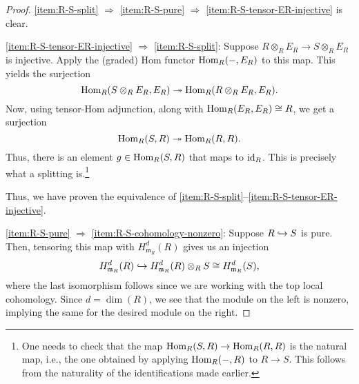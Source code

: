 \documentclass[12pt]{article}
\begin{document}
\begin{proof} 
	\ref{item:R-S-split} $\Rightarrow$ \ref{item:R-S-pure} $\Rightarrow$ \ref{item:R-S-tensor-ER-injective} is clear.

	\ref{item:R-S-tensor-ER-injective} $\Rightarrow$ \ref{item:R-S-split}: Suppose $R \otimes_{R} E_{R} \to S \otimes_{R} E_{R}$ is injective. \newline
	Apply the (graded) Hom functor $\operatorname{Hom}_{R}(-, E_{R})$ to this map. This yields the surjection
	\begin{equation*} 
		\operatorname{Hom}_{R}(S \otimes_{R} E_{R}, E_{R}) \twoheadrightarrow \operatorname{Hom}_{R}(R \otimes_{R} E_{R}, E_{R}).
	\end{equation*}
	Now, using tensor-Hom adjunction, along with $\operatorname{Hom}_{R}(E_{R}, E_{R}) \cong R$, we get a surjection
	\begin{equation*} 
		\operatorname{Hom}_{R}(S, R) \twoheadrightarrow \operatorname{Hom}_{R}(R, R).
	\end{equation*}
	Thus, there is an element $g \in \operatorname{Hom}_{R}(S, R)$ that maps to $\operatorname{id}_{R}$. This is precisely what a splitting is.\footnote{One needs to check that the map $\operatorname{Hom}_{R}(S, R) \to \operatorname{Hom}_{R}(R, R)$ is the natural map, i.e., the one obtained by applying $\operatorname{Hom}_{R}(-, R)$ to $R \to S$. This follows from the naturality of the identifications made earlier.}

	Thus, we have proven the equivalence of \ref{item:R-S-split}--\ref{item:R-S-tensor-ER-injective}. 

	\ref{item:R-S-pure} $\Rightarrow$ \ref{item:R-S-cohomology-nonzero}: Suppose $R \hookrightarrow S$ is pure. Then, tensoring this map with $H_{\mathfrak{m}_{R}}^{d}(R)$ gives us an injection
	\begin{equation*} 
		H_{\mathfrak{m}_{R}}^{d}(R) \hookrightarrow H_{\mathfrak{m}_{R}}^{d}(R) \otimes_{R} S \cong H_{\mathfrak{m}_{R}}^{d}(S),
	\end{equation*}
	where the last isomorphism follows since we are working with the top local cohomology. Since $d = \dim(R)$, we see that the module on the left is nonzero, implying the same for the desired module on the right.


\end{proof}
\end{document}
